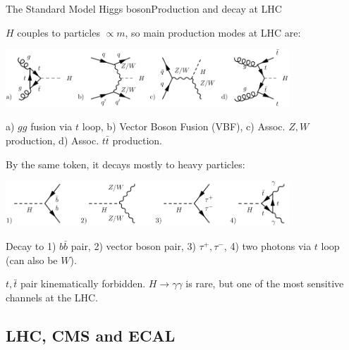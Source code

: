 \documentclass{beamer}
\begin{document}
\begin{frame}{The Standard Model Higgs boson}{Production and decay at LHC}
\begin{itemize}
\vfill \item 
{\tiny $H$ couples to particles $\propto m$, so main production modes at LHC are:}
\begin{center}
\includegraphics[width=0.8\textwidth]{"productions"}
\vfill \item {\tiny a) $gg$ fusion via $t$ loop, b) Vector Boson Fusion (VBF), c) Assoc. $Z,W$ production, d) Assoc. $t\bar{t}$ production.}
\end{center}
\pause
\vfill \item 
{\tiny By the same token, it decays mostly to heavy particles:}
\begin{center}
\includegraphics[width=0.8\textwidth]{"decays"}
\vfill \item {\tiny Decay to 1) $b \bar{b}$ pair, 2) vector boson pair, 3) $\tau^+, \tau^-$, 4) two photons via $t$ loop (can also be $W$).}
\end{center}
\vfill \item {\tiny $t, \bar{t}$ pair kinematically forbidden. $H \rightarrow \gamma \gamma $ is rare, but one of the most sensitive channels at the LHC.}

\end{itemize}
\end{frame}


\subsection{LHC, CMS and ECAL}
\end{document}
